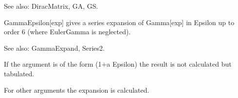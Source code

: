 See also:  DiracMatrix, GA, GS.



\dispSFoutmath{
\mu
}

\dispSFinmath{
\nu
}


\dispSFinmath{
{{\gamma }^{\mu }}
}










GammaEpsilon[exp] gives a series expansion of Gamma[exp] in Epsilon up to order 6 (where EulerGamma is neglected).

See also:  GammaExpand, Series2.


If the argument is of the form (1\(+\)a Epsilon) the result is not calculated but tabulated.





For other arguments the expansion is calculated.



